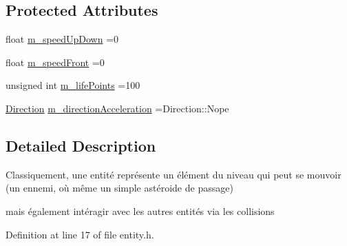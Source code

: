 \subsection*{Protected Attributes}
\begin{DoxyCompactItemize}
\item 
float \hyperlink{class_entity_aee87de23c1e63a14dff1f2dd8597496d}{m\-\_\-speed\-Up\-Down} =0
\item 
float \hyperlink{class_entity_a6355c1ec7f08c88b955c7960b8e1ef60}{m\-\_\-speed\-Front} =0
\item 
unsigned int \hyperlink{class_entity_aeffb6deae5015518100f49b680a44fa0}{m\-\_\-life\-Points} =100
\item 
\hyperlink{class_entity_ac6ff3a9435d7dacb378891eadd127034}{Direction} \hyperlink{class_entity_a687d37b15315f2b663f1b63576281bd2}{m\-\_\-direction\-Acceleration} =Direction\-::\-Nope
\end{DoxyCompactItemize}


\subsection{Detailed Description}
Classiquement, une entité représente un élément du niveau qui peut se mouvoir (un ennemi, où même un simple astéroide de passage) \par
mais également intéragir avec les autres entités via les collisions 

Definition at line 17 of file entity.\-h.



